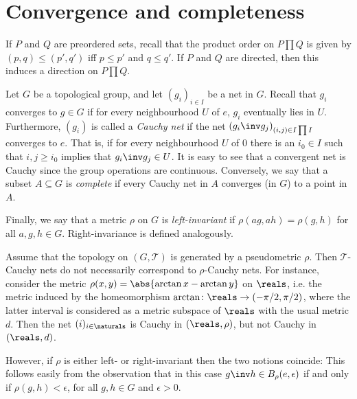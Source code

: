 \documentclass[article, a4paper, 11pt, oneside]{memoir}
\numberwithin{equation}{chapter}
\newcommand{\calT}{\mathcal{T}}
\begin{document}
\section{Convergence and completeness}

\renewcommand{\ball}[3][]{B_{#1}(#2,#3)}
\newcommand{\cball}[3][]{\overline{B}_{#1}(#2,#3)}
\newcommand{\pball}[3][]{B'_{#1}(#2,#3)}

If $P$ and $Q$ are preordered sets, recall that the product order on $P \prod Q$ is given by $(p,q) \leq (p',q')$ iff $p \leq p'$ and $q \leq q'$. If $P$ and $Q$ are directed, then this induces a direction on $P \prod Q$.

Let $G$ be a topological group, and let $(g_i)_{i \in I}$ be a net in $G$. Recall that $g_i$ converges to $g \in G$ if for every neighbourhood $U$ of $e$, $g_i$ eventually lies in $U$. Furthermore, $(g_i)$ is called a \emph{Cauchy net} if the net $(g_i\inv g_j)_{(i,j) \in I \prod I}$ converges to $e$. That is, if for every neighbourhood $U$ of $0$ there is an $i_0 \in I$ such that $i,j \geq i_0$ implies that $g_i\inv g_j \in U$. It is easy to see that a convergent net is Cauchy since the group operations are continuous. Conversely, we say that a subset $A \subseteq G$ is \emph{complete} if every Cauchy net in $A$ converges (in $G$) to a point in $A$.

Finally, we say that a metric $\rho$ on $G$ is \emph{left-invariant} if $\rho(ag,ah) = \rho(g,h)$ for all $a,g,h \in G$. Right-invariance is defined analogously.

\begin{remark}
    Assume that the topology on $(G,\calT)$ is generated by a pseudometric $\rho$. Then $\calT$-Cauchy nets do not necessarily correspond to $\rho$-Cauchy nets. For instance, consider the metric $\rho(x,y) = \abs{\arctan x - \arctan y}$ on $\reals$, i.e. the metric induced by the homeomorphism $\arctan \colon \reals \to (-\pi/2, \pi/2)$, where the latter interval is considered as a metric subspace of $\reals$ with the usual metric $d$. Then the net $(i)_{i \in \naturals}$ is Cauchy in $(\reals, \rho)$, but not Cauchy in $(\reals, d)$.

    However, if $\rho$ is either left- or right-invariant then the two notions coincide: This follows easily from the observation that in this case $g\inv h \in \ball[\rho]{e}{\epsilon}$ if and only if $\rho(g,h) < \epsilon$, for all $g,h \in G$ and $\epsilon > 0$.
\end{remark}
\end{document}
